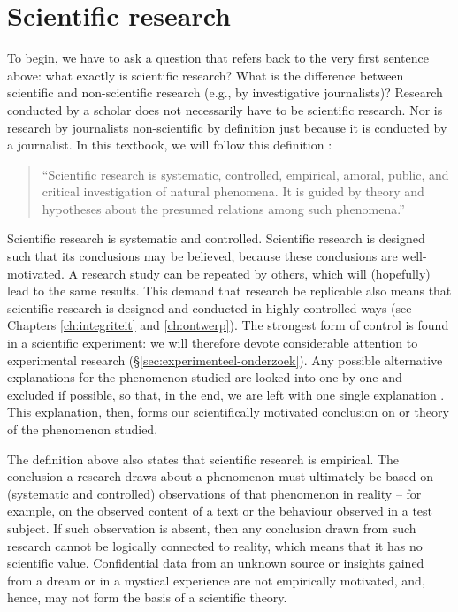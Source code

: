\documentclass[
]{book}
\begin{document}
\hypertarget{sec:scientific-research}{%
\section{Scientific research}\label{sec:scientific-research}}

To begin, we have to ask a question that refers back to the very first sentence above: what exactly is scientific research? What is the difference between scientific and non-scientific research (e.g., by investigative journalists)? Research conducted by a scholar does not necessarily have to be scientific research. Nor is research by journalists non-scientific by definition just because it is conducted by a journalist. In this textbook, we will follow this definition \citep[p.14]{KL00}:

\begin{quote}
``Scientific
research is systematic, controlled, empirical, amoral, public, and
critical investigation of natural phenomena. It is guided by theory and hypotheses about the presumed relations among such phenomena.''
\end{quote}

Scientific research is systematic and controlled. Scientific research is designed such that its conclusions may be believed, because these conclusions are well-motivated. A research study can be repeated by others, which will (hopefully) lead to the same results. This demand that research be replicable also means that scientific research is designed and conducted in highly controlled ways (see Chapters \ref{ch:integriteit} and \ref{ch:ontwerp}).
The strongest form of control is found in a scientific experiment: we will therefore devote considerable attention to experimental research (§\ref{sec:experimenteel-onderzoek}). Any possible alternative explanations for the phenomenon studied are looked into one by one and excluded if possible, so that, in the end, we are left with one single explanation \citep{KL00}. This explanation, then, forms our scientifically motivated conclusion on or theory of the phenomenon studied.

The definition above also states that scientific research is empirical. The conclusion a research draws about a phenomenon must ultimately be based on (systematic and controlled) observations of that phenomenon in reality -- for example, on the observed content of a text or the behaviour observed in a test subject. If such observation is absent, then any conclusion drawn from such research cannot be logically connected to reality, which means that it has no scientific value. Confidential data from an unknown source or insights gained from a dream or in a mystical experience are not empirically motivated, and, hence, may not form the basis of a scientific theory.
\end{document}

